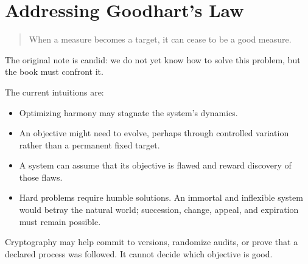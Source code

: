\chapter{Addressing Goodhart's Law}
\label{chap:addressing-goodharts-law}


\begin{quote}
When a measure becomes a target, it can cease to be a good measure.
\end{quote}

The original note is candid: we do not yet know how to solve this problem, but
the book must confront it.

The current intuitions are:

\begin{itemize}
  \item Optimizing harmony may stagnate the system's dynamics.
  \item An objective might need to evolve, perhaps through controlled
  variation rather than a permanent fixed target.
  \item A system can assume that its objective is flawed and reward discovery
  of those flaws.
  \item Hard problems require humble solutions. An immortal and inflexible
  system would betray the natural world; succession, change, appeal, and
  expiration must remain possible.
\end{itemize}

Cryptography may help commit to versions, randomize audits, or prove that a
declared process was followed. It cannot decide which objective is good.
